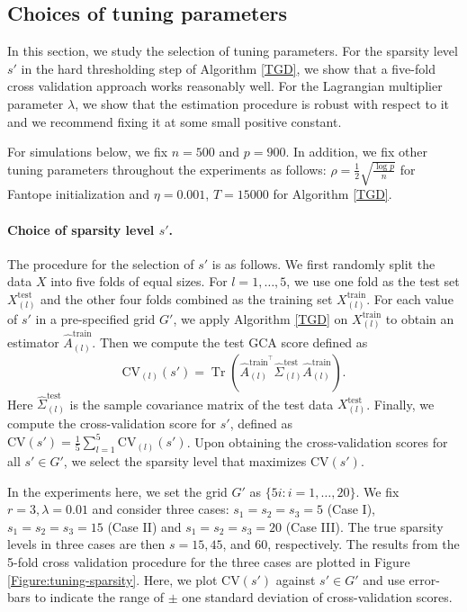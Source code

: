 \documentclass[11pt]{article}
\DeclareMathOperator{\Tr}{Tr}
\newcommand{\0}{{\mathbf{0}}}
\begin{document}
\subsection{Choices of tuning parameters}
\label{sec:tuning_parameter_exp}
In this section, we study the selection of tuning parameters. 
For the sparsity level $s'$ in the hard thresholding step of Algorithm \ref{TGD}, we show that a five-fold cross validation approach works reasonably well.
For the Lagrangian multiplier parameter $\lambda$, we show that the estimation procedure is robust with respect to it and we recommend fixing it at some small positive constant.

For simulations below, we fix $n=500$ and $p = 900$. 
In addition, we fix other tuning parameters throughout the experiments as follows: $\rho = \frac{1}{2}\sqrt{\frac{\log p}{n}}$ for Fantope initialization and $\eta=0.001$, $T=15000$ for Algorithm \ref{TGD}.

\paragraph{Choice of sparsity level $s'$.} 
The procedure for the selection of $s'$ is as follows. 
We first randomly split the data $X$ into five folds of equal sizes. 
For $l=1, \dots, 5$, we use one fold as the test set $X^{\mathrm{test}}_{(l)}$ and the other four folds combined as the training set $X^{\mathrm{train}}_{(l)}$. For each value of $s'$ in a pre-specified grid $G'$, we apply Algorithm \ref{TGD} on $X^{\mathrm{train}}_{(l)}$ to obtain an estimator $\widehat{A}^{\mathrm{train}}_{(l)}$. 
Then we compute the test GCA score defined as 
\begin{equation*}
\mathrm{CV}_{(l)}(s') = \Tr\left(\widehat{A}^{\mathrm{train}^\top}_{(l)} \widehat{\Sigma}_{(l)}^{\mathrm{test}}\widehat{A}^{\mathrm{train}}_{(l)}\right).
\end{equation*}
Here $\widehat{\Sigma}_{(l)}^{\mathrm{test}}$ is the sample covariance matrix of the test data $X^{\mathrm{test}}_{(l)}$. 
Finally, we compute the cross-validation score for $s'$, defined as $\mathrm{CV}(s') = \frac{1}{5}\sum_{l=1}^{5} \mathrm{CV}_{(l)} (s')$. 
Upon obtaining the cross-validation scores for all $s'\in G'$, we select the sparsity level that maximizes $\mathrm{CV}(s')$.

In the experiments here, we set the 
grid $G'$ as $\{5i:i=1,\dots, 20\}$. 
We fix $r=3, \lambda = 0.01$ and consider three cases: $s_1=s_2=s_3=5$ (Case I), $s_1=s_2=s_3=15$ (Case II) and $s_1=s_2=s_3=20$ (Case III). 
The true sparsity levels in three cases are then $s = 15, 45$, and $60$, respectively. 
The results from the 5-fold cross validation procedure for the three cases are plotted in Figure \ref{Figure:tuning-sparsity}. 
Here, we plot $\mathrm{CV}(s')$ against $s'\in G'$ and use error-bars to indicate the range of $\pm$ one standard deviation of cross-validation scores. 
\end{document}
